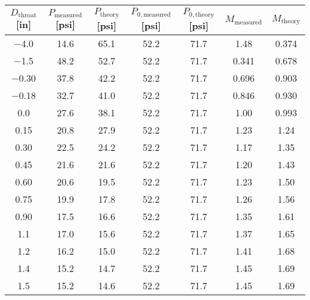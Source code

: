 \begin{tabular}{ccccccc}
\toprule
$D_\text{throat}$ [\unit{in}] & $P_\text{measured}$ [\unit{psi}] & $P_\text{theory}$ [\unit{psi}] & $P_{0,\text{measured}}$ [\unit{psi}] & $P_{0,\text{theory}}$ [\unit{psi}] & $M_\text{measured}$ & $M_\text{theory}$ \\
\midrule
\num{-4.0} & \num{14.6} & \num{65.1} & \num{52.2} & \num{71.7} & \num{1.48} & \num{0.374} \\ 
\num{-1.5} & \num{48.2} & \num{52.7} & \num{52.2} & \num{71.7} & \num{0.341} & \num{0.678} \\ 
\num{-0.30} & \num{37.8} & \num{42.2} & \num{52.2} & \num{71.7} & \num{0.696} & \num{0.903} \\ 
\num{-0.18} & \num{32.7} & \num{41.0} & \num{52.2} & \num{71.7} & \num{0.846} & \num{0.930} \\ 
\num{0.0} & \num{27.6} & \num{38.1} & \num{52.2} & \num{71.7} & \num{1.00} & \num{0.993} \\ 
\num{0.15} & \num{20.8} & \num{27.9} & \num{52.2} & \num{71.7} & \num{1.23} & \num{1.24} \\ 
\num{0.30} & \num{22.5} & \num{24.2} & \num{52.2} & \num{71.7} & \num{1.17} & \num{1.35} \\ 
\num{0.45} & \num{21.6} & \num{21.6} & \num{52.2} & \num{71.7} & \num{1.20} & \num{1.43} \\ 
\num{0.60} & \num{20.6} & \num{19.5} & \num{52.2} & \num{71.7} & \num{1.23} & \num{1.50} \\ 
\num{0.75} & \num{19.9} & \num{17.8} & \num{52.2} & \num{71.7} & \num{1.26} & \num{1.56} \\ 
\num{0.90} & \num{17.5} & \num{16.6} & \num{52.2} & \num{71.7} & \num{1.35} & \num{1.61} \\ 
\num{1.1} & \num{17.0} & \num{15.6} & \num{52.2} & \num{71.7} & \num{1.37} & \num{1.65} \\ 
\num{1.2} & \num{16.2} & \num{15.0} & \num{52.2} & \num{71.7} & \num{1.41} & \num{1.68} \\ 
\num{1.4} & \num{15.2} & \num{14.7} & \num{52.2} & \num{71.7} & \num{1.45} & \num{1.69} \\ 
\num{1.5} & \num{15.2} & \num{14.6} & \num{52.2} & \num{71.7} & \num{1.45} & \num{1.69} \\ 
\bottomrule
\end{tabular}